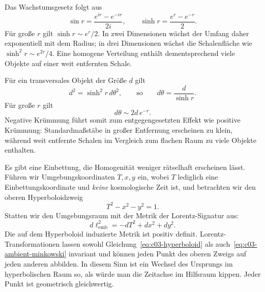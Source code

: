 Das Wachstumsgesetz folgt aus
\begin{equation}
\sin r = \frac{e^{ir}-e^{-ir}}{2i},
\qquad
\sinh r = \frac{e^r-e^{-r}}{2}.
\label{eq:c03-sin-sinh}
\end{equation}
Für große \(r\) gilt \(\sinh r\sim e^r/2\). In zwei Dimensionen wächst der Umfang daher exponentiell mit dem Radius; in drei Dimensionen wächst die Schalenfläche wie \(\sinh^2r\sim e^{2r}/4\). Eine homogene Verteilung enthält dementsprechend viele Objekte auf einer weit entfernten Schale.

Für ein transversales Objekt der Größe \(d\) gilt
\begin{equation}
d^2 = \sinh^2 r\, d\theta^2,
\qquad\text{so}\qquad
d\theta = \frac{d}{\sinh r}.
\label{eq:c03-hyperbolic-angle}
\end{equation}
Für große \(r\) gilt
\begin{equation}
d\theta \sim 2d\,e^{-r}.
\end{equation}
Negative Krümmung führt somit zum entgegengesetzten Effekt wie positive Krümmung: Standardmaßstäbe in großer Entfernung erscheinen zu klein, während weit entfernte Schalen im Vergleich zum flachen Raum zu viele Objekte enthalten.

\begin{classroomqa}\end{classroomqa}

Es gibt eine Einbettung, die Homogenität weniger rätselhaft erscheinen lässt. Führen wir Umgebungskoordinaten \(T,x,y\) ein, wobei \(T\) lediglich eine Einbettungskoordinate und \emph{keine} kosmologische Zeit ist, und betrachten wir den oberen Hyperboloidzweig
\begin{equation}
T^2 - x^2 - y^2 = 1.
\label{eq:c03-hyperboloid}
\end{equation}
Statten wir den Umgebungsraum mit der Metrik der Lorentz-Signatur aus:
\begin{equation}
d\ell_{\mathrm{emb}}^2=-dT^2+dx^2+dy^2.
\label{eq:c03-ambient-minkowski}
\end{equation}
Die auf dem Hyperboloid induzierte Metrik ist positiv definit. Lorentz-Transformationen lassen sowohl Gleichung~\eqref{eq:c03-hyperboloid} als auch~\eqref{eq:c03-ambient-minkowski} invariant und können jeden Punkt des oberen Zweigs auf jeden anderen abbilden. In diesem Sinn ist ein Wechsel des Ursprungs im hyperbolischen Raum so, als würde man die Zeitachse im Hilfsraum kippen. Jeder Punkt ist geometrisch gleichwertig.

